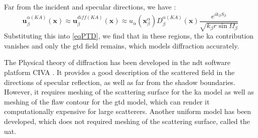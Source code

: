 Far from the incident and specular directions, we have :
\begin{equation}
\mathbf{u}_{\beta}^{\alpha(KA)}(\mathbf{x})\approx \mathbf{u}_{\beta}^{diff(KA)}(\mathbf{x}) \approx u_{\alpha}(\mathbf{x}_{\beta}^{\alpha})D_{\beta}^{\alpha(KA)}(\mathbf{x})\dfrac{e^{ik_{\beta}S_{\beta}}}{\sqrt{k_{\beta}r\sin\Omega_{\beta}}}
\end{equation}
Substituting this into \eqref{eqPTD}, we find that in these regions, the \acrshort{ka} contribution vanishes and only the \acrshort{gtd} field remains, which models diffraction accurately.

The Physical theory of diffraction has been developed in the \acrshort{ndt} software platform CIVA \cite{systmodel}. It provides a good description of the scattered field in the directions of specular reflection, as well as far from the shadow boundaries. However, it requires meshing of the scattering surface for the \acrshort{ka} model as well as meshing of the flaw contour for the \acrshort{gtd} model, which can render it computationally expensive for large scatterers. Another uniform model has been developed, which does not required meshing of the scattering surface, called the \acrfull{uat}.

